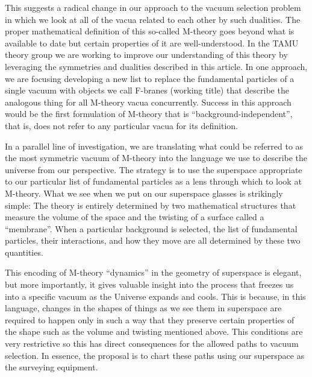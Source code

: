 \documentclass[12pt, fleqn]{article}
\begin{document}
This suggests a radical change in our approach to the vacuum selection problem in which we look at all of the vacua related to each other by such dualities.
The proper mathematical definition of this so-called M-theory goes beyond what is available to date but certain properties of it are well-understood. 
In the TAMU theory group we are working to improve our understanding of this theory by leveraging the symmetries and dualities described in this article. 
In one approach, we are focusing developing a new list to replace the fundamental particles of a single vacuum with objects we call F-branes (working title) that describe the analogous thing for all M-theory vacua concurrently. 
Success in this approach would be the first formulation of M-theory that is ``background-independent'', that is, does not refer to any particular vacua for its definition. 

In a parallel line of investigation, we are translating what could be referred to as the most symmetric vacuum of M-theory into the language we use to describe the universe from our perspective. 
The strategy is to use the superspace appropriate to our particular list of fundamental particles as a lens through which to look at M-theory.
What we see when we put on our superspace glasses is strikingly simple: 
The theory is entirely determined by two mathematical structures that measure the volume of the space and the twisting of a surface called a ``membrane''. 
When a particular background is selected, the list of fundamental particles, their interactions, and how they move are all determined by these two quantities.

This encoding of M-theory ``dynamics'' in the geometry of superspace is elegant, but more importantly, it gives valuable insight into the process that freezes us into a specific vacuum as the Universe expands and cools. 
This is because, in this language, changes in the shapes of things as we see them in superspace are required to happen only in such a way that they preserve certain properties of the shape such as the volume and twisting mentioned above.
This conditions are very restrictive so this has direct consequences for the allowed paths to vacuum selection. 
In essence, the proposal is to chart these paths using our superspace as the surveying equipment. 
\end{document}
